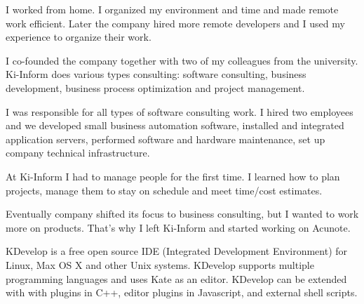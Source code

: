 \documentclass[12pt]{letter}
\begin{document}
\begin{llist}
           \item I worked from home. I organized my environment and time and made remote work efficient. Later the company hired more remote developers and I used my experience to organize their work.

  \endexperience


  \startexperience

           \item I co-founded the company together with two of my colleagues from the university. Ki-Inform does various types consulting: software consulting, business development, business process optimization and project management.

           \item  I was responsible for all types of software consulting work. I hired two employees and we developed small business automation software, installed and integrated application servers, performed software and hardware maintenance, set up company technical infrastructure.

           \item  At Ki-Inform I had to manage people for the first time. I learned how to plan projects, manage them to stay on schedule and meet time/cost estimates.

           \item  Eventually company shifted its focus to business consulting, but I wanted to work more on products. That's why I left Ki-Inform and started working on Acunote.

  \endexperience




  \location{}

  \startexperience

           \item KDevelop is a free open source IDE (Integrated Development Environment) for Linux, Max OS X and other Unix systems. KDevelop supports multiple programming languages and uses Kate as an editor. KDevelop can be extended with with plugins in C++, editor plugins in Javascript, and external shell scripts.


\end{llist}
\end{document}
